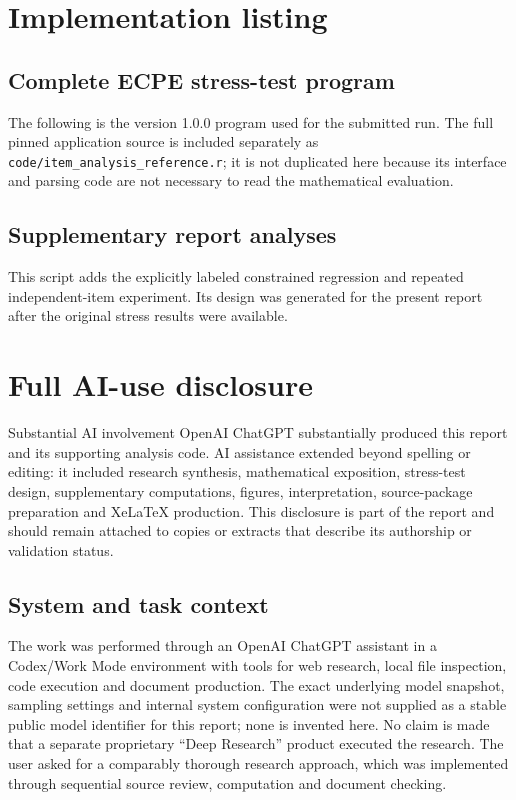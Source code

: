 \documentclass[11pt,a4paper,oneside,headings=normal,parskip=half]{scrreprt}
\newcommand{\code}[1]{\nolinkurl{#1}}
\begin{document}
\chapter{Implementation listing}\label{app:code}
\section{Complete ECPE stress-test program}
The following is the version 1.0.0 program used for the submitted run. The full pinned application source is included separately as \code{code/item_analysis_reference.r}; it is not duplicated here because its interface and parsing code are not necessary to read the mathematical evaluation.

\section{Supplementary report analyses}
This script adds the explicitly labeled constrained regression and repeated independent-item experiment. Its design was generated for the present report after the original stress results were available.


\chapter{Full AI-use disclosure}\label{app:ai}
\begin{caution}{Substantial AI involvement}
OpenAI ChatGPT substantially produced this report and its supporting analysis code. AI assistance extended beyond spelling or editing: it included research synthesis, mathematical exposition, stress-test design, supplementary computations, figures, interpretation, source-package preparation and XeLaTeX production. This disclosure is part of the report and should remain attached to copies or extracts that describe its authorship or validation status.
\end{caution}

\section{System and task context}
The work was performed through an OpenAI ChatGPT assistant in a Codex/Work Mode environment with tools for web research, local file inspection, code execution and document production. The exact underlying model snapshot, sampling settings and internal system configuration were not supplied as a stable public model identifier for this report; none is invented here. No claim is made that a separate proprietary ``Deep Research'' product executed the research. The user asked for a comparably thorough research approach, which was implemented through sequential source review, computation and document checking.
\end{document}
